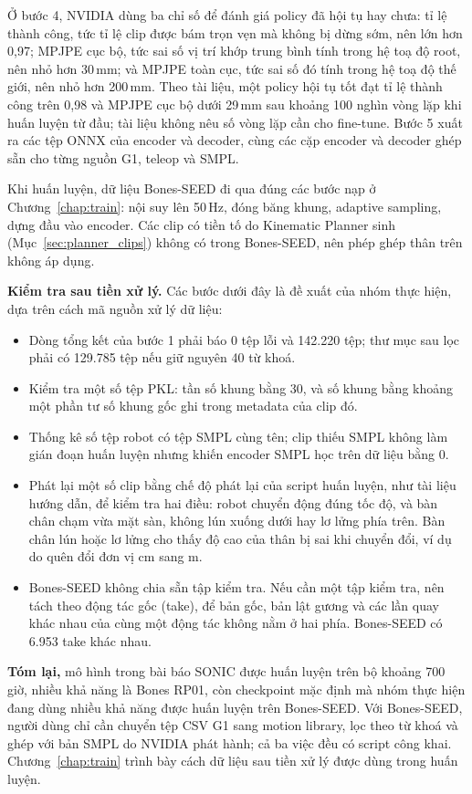 \documentclass[12pt,a4paper,oneside]{report}
\begin{document}
Ở bước 4, NVIDIA dùng ba chỉ số để đánh giá policy đã hội tụ hay chưa: tỉ lệ thành công, tức tỉ lệ clip được bám trọn vẹn mà không bị dừng sớm, nên lớn hơn 0,97; MPJPE cục bộ, tức sai số vị trí khớp trung bình tính trong hệ toạ độ root, nên nhỏ hơn 30\,mm; và MPJPE toàn cục, tức sai số đó tính trong hệ toạ độ thế giới, nên nhỏ hơn 200\,mm. Theo tài liệu, một policy hội tụ tốt đạt tỉ lệ thành công trên 0,98 và MPJPE cục bộ dưới 29\,mm sau khoảng 100 nghìn vòng lặp khi huấn luyện từ đầu; tài liệu không nêu số vòng lặp cần cho fine-tune. Bước 5 xuất ra các tệp ONNX của encoder và decoder, cùng các cặp encoder và decoder ghép sẵn cho từng nguồn G1, teleop và SMPL.

Khi huấn luyện, dữ liệu Bones-SEED đi qua đúng các bước nạp ở Chương~\ref{chap:train}: nội suy lên 50\,Hz, đóng băng khung, adaptive sampling, dựng đầu vào encoder. Các clip có tiền tố do Kinematic Planner sinh (Mục~\ref{sec:planner_clips}) không có trong Bones-SEED, nên phép ghép thân trên không áp dụng.

\textbf{Kiểm tra sau tiền xử lý.} Các bước dưới đây là đề xuất của nhóm thực hiện, dựa trên cách mã nguồn xử lý dữ liệu:
\begin{itemize}
\item Dòng tổng kết của bước 1 phải báo 0 tệp lỗi và 142.220 tệp; thư mục sau lọc phải có 129.785 tệp nếu giữ nguyên 40 từ khoá.
\item Kiểm tra một số tệp PKL: tần số khung bằng 30, và số khung bằng khoảng một phần tư số khung gốc ghi trong metadata của clip đó.
\item Thống kê số tệp robot có tệp SMPL cùng tên; clip thiếu SMPL không làm gián đoạn huấn luyện nhưng khiến encoder SMPL học trên dữ liệu bằng 0.
\item Phát lại một số clip bằng chế độ phát lại của script huấn luyện, như tài liệu hướng dẫn, để kiểm tra hai điều: robot chuyển động đúng tốc độ, và bàn chân chạm vừa mặt sàn, không lún xuống dưới hay lơ lửng phía trên. Bàn chân lún hoặc lơ lửng cho thấy độ cao của thân bị sai khi chuyển đổi, ví dụ do quên đổi đơn vị cm sang m.
\item Bones-SEED không chia sẵn tập kiểm tra. Nếu cần một tập kiểm tra, nên tách theo động tác gốc (take), để bản gốc, bản lật gương và các lần quay khác nhau của cùng một động tác không nằm ở hai phía. Bones-SEED có 6.953 take khác nhau.
\end{itemize}

\textbf{Tóm lại,} mô hình trong bài báo SONIC được huấn luyện trên bộ khoảng 700 giờ, nhiều khả năng là Bones RP01, còn checkpoint mặc định mà nhóm thực hiện đang dùng nhiều khả năng được huấn luyện trên Bones-SEED. Với Bones-SEED, người dùng chỉ cần chuyển tệp CSV G1 sang motion library, lọc theo từ khoá và ghép với bản SMPL do NVIDIA phát hành; cả ba việc đều có script công khai. Chương~\ref{chap:train} trình bày cách dữ liệu sau tiền xử lý được dùng trong huấn luyện.
\end{document}
